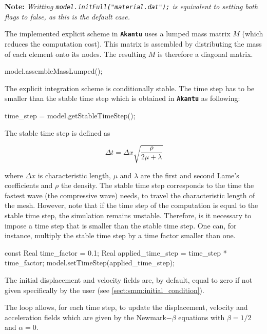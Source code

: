 \documentclass[a4paper,11pt]{book}
\newcommand{\akantu}{\texttt{\textbf{Akantu}}\xspace}
\newcommand{\code}[1]{\texttt{#1}}
\newcommand{\note}[1]{\textbf{Note: }\textit{#1}}
\begin{document}
\note{Writting \code{model.initFull("material.dat");} is equivalent to setting both flags to false, as this is the default case.}

The implemented explicit scheme in \akantu uses a lumped mass matrix $M$ (which reduces the computation cost). This matrix is assembled by distributing the mass of each element onto its nodes. The resulting $M$ is therefore a diagonal matrix.

\begin{cpp}
  model.assembleMassLumped();
\end{cpp}

The explicit integration scheme is conditionally stable. The time step has to be smaller than the stable time step which is obtained in \akantu as following: 

\begin{cpp}
  time_step = model.getStableTimeStep();
\end{cpp}

The stable time step is defined as

\begin{equation}
  \Delta t = \Delta x \sqrt{\frac{\rho}{2 \mu +\lambda}}
\end{equation}
\label{eqn:smm:explicit:stabletime}

where $\Delta x$ is characteristic length, $\mu$ and $\lambda$ are the 
first and second Lame's coefficients and $\rho$ the density. The stable time step corresponds to the time the fastest wave (the compressive wave) needs, to travel the characteristic length of the mesh. 
However, note that if the time step of the computation is equal to the stable time step, 
the simulation remains unstable. Therefore, is it necessary to impose a time step that is smaller than the stable time step. One can, for instance, multiply  the stable time step by a time factor smaller than one. 

\begin{cpp}
  const Real time_factor = 0.1;
  Real applied_time_step = time_step * time_factor;
  model.setTimeStep(applied_time_step);
\end{cpp}
 
The initial displacement and velocity fields are, by default, equal to zero if not given specifically by the user (see \ref{sect:smm:initial_condition}).

The loop allows, for each time step, to update the displacement, velocity 
and acceleration fields which are given by the Newmark$-\beta$ equations with $\beta=1/2$ 
and $\alpha=0$.
\end{document}
